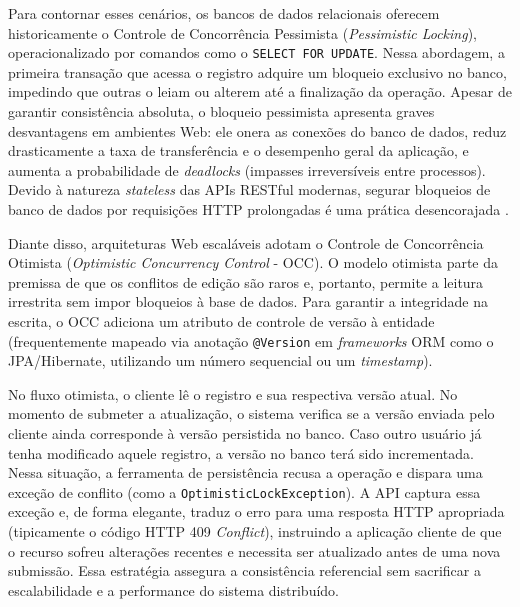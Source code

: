 Para contornar esses cenários, os bancos de dados relacionais oferecem historicamente o Controle de Concorrência Pessimista (\textit{Pessimistic Locking}), operacionalizado por comandos como o \texttt{SELECT FOR UPDATE}. Nessa abordagem, a primeira transação que acessa o registro adquire um bloqueio exclusivo no banco, impedindo que outras o leiam ou alterem até a finalização da operação. Apesar de garantir consistência absoluta, o bloqueio pessimista apresenta graves desvantagens em ambientes Web: ele onera as conexões do banco de dados, reduz drasticamente a taxa de transferência e o desempenho geral da aplicação, e aumenta a probabilidade de \textit{deadlocks} (impasses irreversíveis entre processos). Devido à natureza \textit{stateless} das APIs RESTful modernas, segurar bloqueios de banco de dados por requisições HTTP prolongadas é uma prática desencorajada \cite{kleppmann2017}.

Diante disso, arquiteturas Web escaláveis adotam o Controle de Concorrência Otimista (\textit{Optimistic Concurrency Control} - OCC). O modelo otimista parte da premissa de que os conflitos de edição são raros e, portanto, permite a leitura irrestrita sem impor bloqueios à base de dados. Para garantir a integridade na escrita, o OCC adiciona um atributo de controle de versão à entidade (frequentemente mapeado via anotação \texttt{@Version} em \textit{frameworks} ORM como o JPA/Hibernate, utilizando um número sequencial ou um \textit{timestamp}).

No fluxo otimista, o cliente lê o registro e sua respectiva versão atual. No momento de submeter a atualização, o sistema verifica se a versão enviada pelo cliente ainda corresponde à versão persistida no banco. Caso outro usuário já tenha modificado aquele registro, a versão no banco terá sido incrementada. Nessa situação, a ferramenta de persistência recusa a operação e dispara uma exceção de conflito (como a \texttt{OptimisticLockException}). A API captura essa exceção e, de forma elegante, traduz o erro para uma resposta HTTP apropriada (tipicamente o código HTTP 409 \textit{Conflict}), instruindo a aplicação cliente de que o recurso sofreu alterações recentes e necessita ser atualizado antes de uma nova submissão. Essa estratégia assegura a consistência referencial sem sacrificar a escalabilidade e a performance do sistema distribuído.